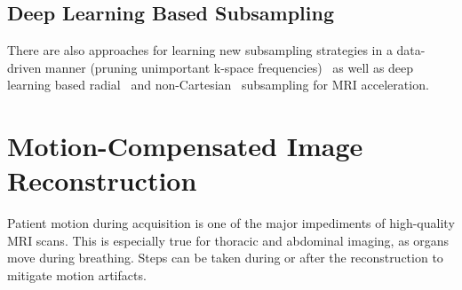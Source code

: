 \documentclass[english,version-2022-01]{uzl-thesis} %
\begin{document}
\subsection{Deep Learning Based Subsampling} \label{SubSec:DeepLearningBasedSubsampling}
There are also approaches for learning new subsampling strategies in a data-driven manner (pruning unimportant k-space frequencies)~\cite{MRISubsamplingPruning} as well as deep learning based radial~\cite{DeepMRIReconstructionRadialSubsampling} and non-Cartesian~\cite{DeepMRIReconstructionSubsampling} subsampling for MRI acceleration.


\section{Motion-Compensated Image Reconstruction} \label{Sec:Motion-CompensatedReconstruction}
Patient motion during acquisition is one of the major impediments of high-quality MRI scans. This is especially true for thoracic and abdominal imaging, as organs move during breathing. Steps can be taken during or after the reconstruction to mitigate motion artifacts.
\end{document}
